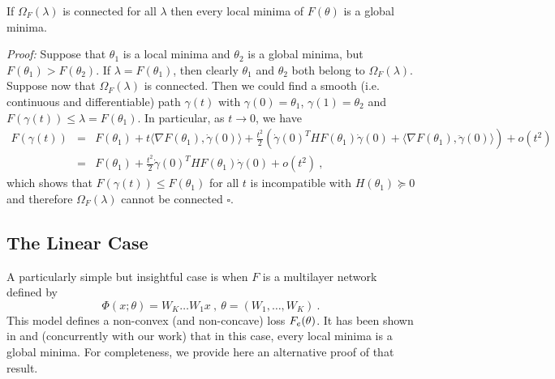 \begin{proposition}
If $\Omega_F(\lambda)$ is connected for all $\lambda$ then every local minima of $F(\theta)$ is a global minima. 
\end{proposition}
{\it Proof:} Suppose that $\theta_1$ is a local minima and $\theta_2$ is a global minima, 
but $F(\theta_1) > F(\theta_2)$. If $\lambda = F(\theta_1)$, then clearly 
$\theta_1$ and $\theta_2$ both belong to $\Omega_F(\lambda)$. Suppose 
now that $\Omega_F(\lambda)$ 
is connected. Then we could find a smooth (i.e. continuous and differentiable) path $\gamma(t)$ 
with $\gamma(0) = \theta_1$, $\gamma(1)= \theta_2$ and $F(\gamma(t)) \leq \lambda = F(\theta_1)$.
In particular, as $t \to 0$, we have
\begin{eqnarray*}
F(\gamma(t)) &=& F(\theta_1) + t \langle \nabla F(\theta_1) , \dot{\gamma}(0) \rangle + \frac{t^2}{2} \left(\dot{\gamma}(0)^T H F(\theta_1) \dot{\gamma}(0) + \langle \nabla F(\theta_1), \ddot{\gamma}(0) \rangle \right) + o(t^2) \\
&=& F(\theta_1) +   \frac{t^2}{2}  \dot{\gamma}(0)^T H F(\theta_1) \dot{\gamma}(0)  + o(t^2) ~,
\end{eqnarray*}
which shows that $F(\gamma(t)) \leq F(\theta_1)$ for all $t$ is incompatible with $H(\theta_1) \succeq 0$ and therefore $\Omega_F(\lambda)$ cannot be connected $\square$.


\subsection{The Linear Case}

A particularly simple but insightful case is 
when $F$ is a multilayer network defined by
\begin{equation}
\label{linearcase}
\Phi(x;\theta) = W_K \dots W_1 x~,~\theta = (W_1, \dots, W_K)~.
\end{equation}
This model defines a non-convex (and non-concave) loss $F_{e}(\theta)$.
It has been shown in \cite{ganguli} and \cite{linearcase} (concurrently with our work) that in this case, 
every local minima is a global minima.  
For completeness, we provide here an alternative proof of that result.


